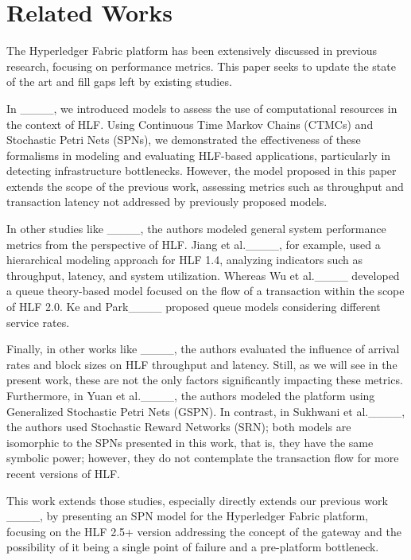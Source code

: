 \section{Related Works}
\label{sec:related}

The Hyperledger Fabric platform has been extensively discussed in previous research, focusing on performance metrics.
This paper seeks to update the state of the art and fill gaps left by existing studies.

In ____, we introduced models to assess the use of computational resources in the context of HLF.
Using Continuous Time Markov Chains (CTMCs) and Stochastic Petri Nets (SPNs), we demonstrated the effectiveness of these formalisms in modeling and evaluating HLF-based applications, particularly in detecting infrastructure bottlenecks.
However, the model proposed in this paper extends the scope of the previous work, assessing metrics such as throughput and transaction latency not addressed by previously proposed models.

In other studies like ____, the authors modeled general system performance metrics from the perspective of HLF.
Jiang et al.____, for example, used a hierarchical modeling approach for HLF 1.4, analyzing indicators such as throughput, latency, and system utilization.
Whereas Wu et al.____ developed a queue theory-based model focused on the flow of a transaction within the scope of HLF 2.0.
Ke and Park____ proposed queue models considering different service rates.

Finally, in other works like ____, the authors evaluated the influence of arrival rates and block sizes on HLF throughput and latency. Still, as we will see in the present work, these are not the only factors significantly impacting these metrics.
Furthermore, in Yuan et al.____, the authors modeled the platform using Generalized Stochastic Petri Nets (GSPN). In contrast, in Sukhwani et al.____, the authors used Stochastic Reward Networks (SRN); both models are isomorphic to the SPNs presented in this work, that is, they have the same symbolic power; however, they do not contemplate the transaction flow for more recent versions of HLF.

This work extends those studies, especially directly extends our previous work ____, by presenting an SPN model for the Hyperledger Fabric platform, focusing on the HLF 2.5+ version addressing the concept of the gateway and the possibility of it being a single point of failure and a pre-platform bottleneck.

